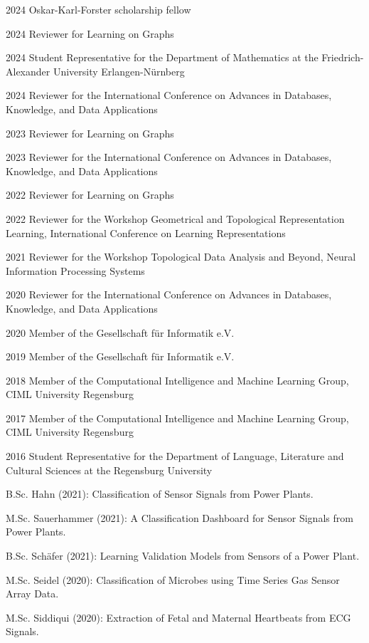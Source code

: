 \documentclass[a4paper, 12pt]{article}
\newcommand{\years}[1]{\marginnote{\scriptsize #1}}
\begin{document}
\years{Public Service}
\vspace{-10pt}
\begin{etaremune}[itemsep=-5pt, leftmargin=15pt]
	\item[2024] Oskar-Karl-Forster scholarship fellow
	\item[2024] Reviewer for Learning on Graphs
	\item[2024] Student Representative for the Department of Mathematics at the Friedrich-Alexander University Erlangen-Nürnberg
	\item[2024] Reviewer for the International Conference on Advances in Databases, Knowledge, and Data Applications
	\item[2023] Reviewer for Learning on Graphs
	\item[2023] Reviewer for the International Conference on Advances in Databases, Knowledge, and Data Applications
	\item[2022] Reviewer for Learning on Graphs
	\item[2022] Reviewer for the Workshop Geometrical and Topological Representation Learning, International Conference on Learning Representations
	\item[2021] Reviewer for the Workshop Topological Data Analysis and Beyond, Neural Information Processing Systems
	\item[2020] Reviewer for the International Conference on Advances in Databases, Knowledge, and Data Applications
	\item[2020] Member of the Gesellschaft für Informatik e.V.
	\item[2019] Member of the Gesellschaft für Informatik e.V.
	\item[2018] Member of the Computational Intelligence and Machine Learning Group, CIML University Regensburg
	\item[2017] Member of the Computational Intelligence and Machine Learning Group, CIML University Regensburg
	\item[2016] Student Representative for the Department of Language, Literature and Cultural Sciences at the Regensburg University
\end{etaremune}
\vspace{10pt}

\years{Thesis Supervision}
\vspace{-10pt}
\begin{etaremune}[itemsep=-5pt, leftmargin=15pt]
	\item B.Sc. Hahn (2021): Classification of Sensor Signals from Power Plants.
	\item M.Sc. Sauerhammer (2021): A Classification Dashboard for Sensor Signals from Power Plants.
	\item B.Sc. Schäfer (2021): Learning Validation Models from Sensors of a Power Plant.
	\item M.Sc. Seidel (2020): Classification of Microbes using Time Series Gas Sensor Array Data.
	\item M.Sc. Siddiqui (2020): Extraction of Fetal and Maternal Heartbeats from ECG Signals.
\end{etaremune}
\end{document}
